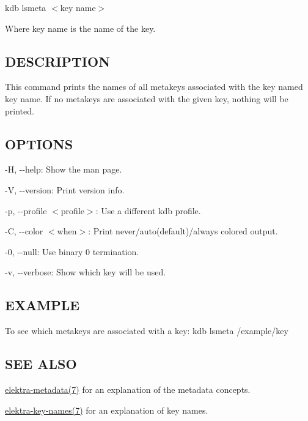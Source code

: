 {\ttfamily kdb lsmeta $<$key name$>$}

Where {\ttfamily key name} is the name of the key.

\subsection*{D\+E\+S\+C\+R\+I\+P\+T\+I\+ON}

This command prints the names of all metakeys associated with the key named {\ttfamily key name}. If no metakeys are associated with the given key, nothing will be printed.

\subsection*{O\+P\+T\+I\+O\+NS}


\begin{DoxyItemize}
\item {\ttfamily -\/H}, {\ttfamily -\/-\/help}\+: Show the man page.
\item {\ttfamily -\/V}, {\ttfamily -\/-\/version}\+: Print version info.
\item {\ttfamily -\/p}, {\ttfamily -\/-\/profile $<$profile$>$}\+: Use a different kdb profile.
\item {\ttfamily -\/C}, {\ttfamily -\/-\/color $<$when$>$}\+: Print never/auto(default)/always colored output.
\item {\ttfamily -\/0}, {\ttfamily -\/-\/null}\+: Use binary 0 termination.
\item {\ttfamily -\/v}, {\ttfamily -\/-\/verbose}\+: Show which key will be used.
\end{DoxyItemize}

\subsection*{E\+X\+A\+M\+P\+LE}

To see which metakeys are associated with a key\+: {\ttfamily kdb lsmeta /example/key}

\subsection*{S\+EE A\+L\+SO}


\begin{DoxyItemize}
\item \hyperlink{md_doc_help_elektra-metadata_doc_help_elektra-metadata_md}{elektra-\/metadata(7)} for an explanation of the metadata concepts.
\item \hyperlink{md_doc_help_elektra-key-names_doc_help_elektra-key-names_md}{elektra-\/key-\/names(7)} for an explanation of key names. 
\end{DoxyItemize}